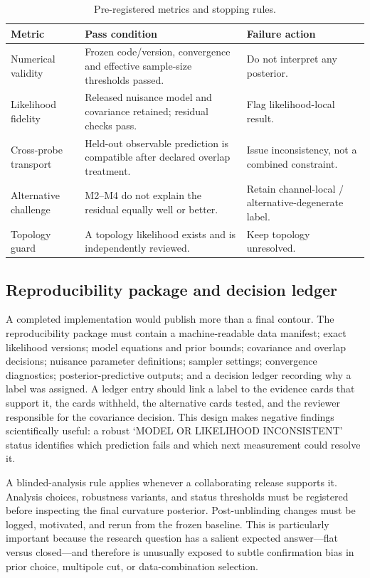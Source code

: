\documentclass[conference]{IEEEtran}
\begin{document}
\begin{table}[t]
\caption{Pre-registered metrics and stopping rules.}
\label{tab:metrics}
\centering
\scriptsize
\setlength{\tabcolsep}{2.2pt}
\begin{tabular}{L{0.27\columnwidth}L{0.35\columnwidth}L{0.28\columnwidth}}
\toprule
\textbf{Metric} & \textbf{Pass condition} & \textbf{Failure action}\\
\midrule
Numerical validity & Frozen code/version, convergence and effective sample-size thresholds passed. & Do not interpret any posterior.\\
Likelihood fidelity & Released nuisance model and covariance retained; residual checks pass. & Flag likelihood-local result.\\
Cross-probe transport & Held-out observable prediction is compatible after declared overlap treatment. & Issue inconsistency, not a combined constraint.\\
Alternative challenge & M2--M4 do not explain the residual equally well or better. & Retain channel-local / alternative-degenerate label.\\
Topology guard & A topology likelihood exists and is independently reviewed. & Keep topology unresolved.\\
\bottomrule
\end{tabular}
\end{table}

\subsection{Reproducibility package and decision ledger}

A completed implementation would publish more than a final contour. The reproducibility package must contain a machine-readable data manifest; exact likelihood versions; model equations and prior bounds; covariance and overlap decisions; nuisance parameter definitions; sampler settings; convergence diagnostics; posterior-predictive outputs; and a decision ledger recording why a label was assigned. A ledger entry should link a label to the evidence cards that support it, the cards withheld, the alternative cards tested, and the reviewer responsible for the covariance decision. This design makes negative findings scientifically useful: a robust `MODEL OR LIKELIHOOD INCONSISTENT' status identifies which prediction fails and which next measurement could resolve it.

A blinded-analysis rule applies whenever a collaborating release supports it. Analysis choices, robustness variants, and status thresholds must be registered before inspecting the final curvature posterior. Post-unblinding changes must be logged, motivated, and rerun from the frozen baseline. This is particularly important because the research question has a salient expected answer---flat versus closed---and therefore is unusually exposed to subtle confirmation bias in prior choice, multipole cut, or data-combination selection.
\end{document}
